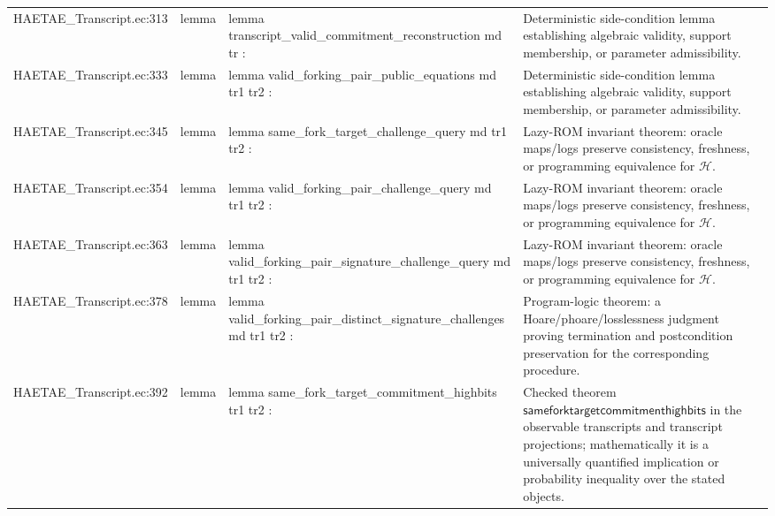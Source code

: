 \documentclass[10pt]{article}
\begin{document}
\begin{longtable}{L{0.11\textwidth}L{0.055\textwidth}L{0.385\textwidth}L{0.41\textwidth}}
HAETAE\_\allowbreak{}Transcript.\allowbreak{}ec:\allowbreak{}313 & lemma & {\ttfamily\scriptsize lemma transcript\_\allowbreak{}valid\_\allowbreak{}commitment\_\allowbreak{}reconstruction md tr :} & Deterministic side-condition lemma establishing algebraic validity, support membership, or parameter admissibility. \\
HAETAE\_\allowbreak{}Transcript.\allowbreak{}ec:\allowbreak{}333 & lemma & {\ttfamily\scriptsize lemma valid\_\allowbreak{}forking\_\allowbreak{}pair\_\allowbreak{}public\_\allowbreak{}equations md tr1 tr2 :} & Deterministic side-condition lemma establishing algebraic validity, support membership, or parameter admissibility. \\
HAETAE\_\allowbreak{}Transcript.\allowbreak{}ec:\allowbreak{}345 & lemma & {\ttfamily\scriptsize lemma same\_\allowbreak{}fork\_\allowbreak{}target\_\allowbreak{}challenge\_\allowbreak{}query md tr1 tr2 :} & Lazy-ROM invariant theorem: oracle maps/logs preserve consistency, freshness, or programming equivalence for $\mathcal H$. \\
HAETAE\_\allowbreak{}Transcript.\allowbreak{}ec:\allowbreak{}354 & lemma & {\ttfamily\scriptsize lemma valid\_\allowbreak{}forking\_\allowbreak{}pair\_\allowbreak{}challenge\_\allowbreak{}query md tr1 tr2 :} & Lazy-ROM invariant theorem: oracle maps/logs preserve consistency, freshness, or programming equivalence for $\mathcal H$. \\
HAETAE\_\allowbreak{}Transcript.\allowbreak{}ec:\allowbreak{}363 & lemma & {\ttfamily\scriptsize lemma valid\_\allowbreak{}forking\_\allowbreak{}pair\_\allowbreak{}signature\_\allowbreak{}challenge\_\allowbreak{}query md tr1 tr2 :} & Lazy-ROM invariant theorem: oracle maps/logs preserve consistency, freshness, or programming equivalence for $\mathcal H$. \\
HAETAE\_\allowbreak{}Transcript.\allowbreak{}ec:\allowbreak{}378 & lemma & {\ttfamily\scriptsize lemma valid\_\allowbreak{}forking\_\allowbreak{}pair\_\allowbreak{}distinct\_\allowbreak{}signature\_\allowbreak{}challenges md tr1 tr2 :} & Program-logic theorem: a Hoare/phoare/losslessness judgment proving termination and postcondition preservation for the corresponding procedure. \\
HAETAE\_\allowbreak{}Transcript.\allowbreak{}ec:\allowbreak{}392 & lemma & {\ttfamily\scriptsize lemma same\_\allowbreak{}fork\_\allowbreak{}target\_\allowbreak{}commitment\_\allowbreak{}highbits tr1 tr2 :} & Checked theorem $\mathsf{sameforktargetcommitmenthighbits}$ in the observable transcripts and transcript projections; mathematically it is a universally quantified implication or probability inequality over the stated objects. \\

\end{longtable}
\end{document}
